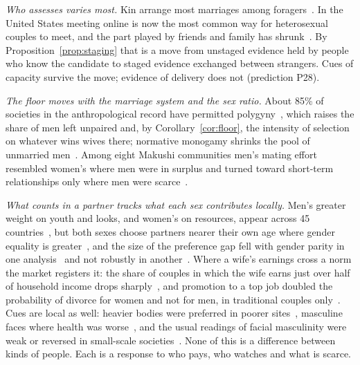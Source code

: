 \emph{Who assesses varies most.} Kin arrange most marriages among foragers~\cite{walker2011}. In the United States meeting
online is now the most common way for heterosexual couples to meet, and the part played by friends and family has
shrunk~\cite{rosenfeld2019}. By Proposition~\ref{prop:staging} that is a move from unstaged evidence held by people who
know the candidate to staged evidence exchanged between strangers. Cues of capacity survive the move; evidence of delivery
does not (prediction P28).

\emph{The floor moves with the marriage system and the sex ratio.} About 85\% of societies in the anthropological record
have permitted polygyny~\cite{henrich2012}, which raises the share of men left unpaired and, by
Corollary~\ref{cor:floor}, the intensity of selection on whatever wins wives there; normative monogamy shrinks the pool of
unmarried men~\cite{henrich2012}. Among eight Makushi communities men's mating effort resembled women's where men were in
surplus and turned toward short-term relationships only where men were scarce~\cite{schacht2015}.

\emph{What counts in a partner tracks what each sex contributes locally.} Men's greater weight on youth and looks, and
women's on resources, appear across 45 countries~\cite{walter2020}, but both sexes choose partners nearer their own age
where gender equality is greater~\cite{walter2020}, and the size of the preference gap fell with gender parity in one
analysis~\cite{zentner2012} and not robustly in another~\cite{walter2020}. Where a wife's earnings cross a norm the market
registers it: the share of couples in which the wife earns just over half of household income drops
sharply~\cite{bertrand2015}, and promotion to a top job doubled the probability of divorce for women and not for men, in
traditional couples only~\cite{folke2020}. Cues are local as well: heavier bodies were preferred in poorer
sites~\cite{swami2010}, masculine faces where health was worse~\cite{debruine2010}, and the usual readings of facial
masculinity were weak or reversed in small-scale societies~\cite{scott2014}. None of this is a difference between kinds of
people. Each is a response to who pays, who watches and what is scarce.


